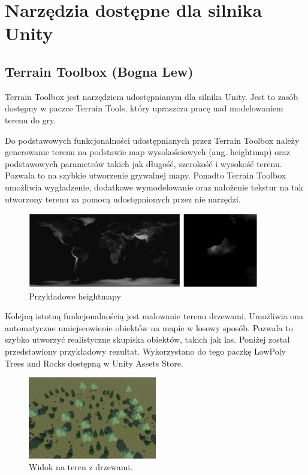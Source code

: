 \section{Narzędzia dostępne dla silnika Unity}
\subsection{Terrain Toolbox (Bogna Lew)}
Terrain Toolbox jest narzędziem udostępnianym dla silnika Unity. Jest to zasób dostępny w paczce Terrain Tools, który
upraszcza pracę nad modelowaniem terenu do gry.

Do podstawowych funkcjonalności udostępnianych przez Terrain Toolbox należy generowanie terenu na podstawie
map wysokościowych (ang. heightmap) oraz podstawowych parametrów takich jak długość, szerokość i wysokość terenu.
Pozwala to na szybkie utworzenie grywalnej mapy. Ponadto Terrain Toolbox umożliwia wygładzenie, dodatkowe
wymodelowanie oraz nałożenie tekstur na tak utworzony terenu za pomocą udostępnionych przez nie narzędzi.

\begin{figure}[h!]
    \centering
    \includegraphics[width=0.9\textwidth]{images/modelowanie_terenu/przykladowe_heightmapy.jpg}
    \caption{Przykładowe heightmapy}\label{fig:przykladowe_heightmapy}
\end{figure}

Kolejną istotną funkcjonalnością jest malowanie terenu drzewami. Umożliwia ona automatyczne umiejscowienie obiektów na
mapie w losowy sposób. Pozwala to szybko utworzyć realistyczne skupiska obiektów, takich jak las. Poniżej
został przedstawiony przykładowy rezultat. Wykorzystano do tego paczkę LowPoly Trees and Rocks dostępną w Unity
Assets Store.

\begin{figure}[h!]
    \centering
    \includegraphics[width=0.5\textwidth]{images/modelowanie_terenu/drzewa.jpg}
    \caption{Widok na teren z drzewami.}\label{fig:pomalowane_drzewa}
\end{figure}
